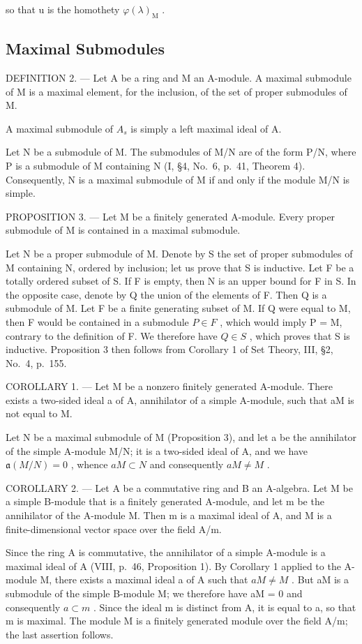 so that u is the homothety \(\varphi(\lambda)_{\mathrm{M}}\) .

\subsection{Maximal Submodules}

DEFINITION 2. --- Let A be a ring and M an A-module. A maximal submodule of M is a maximal element, for the inclusion, of the set of proper submodules of M.

A maximal submodule of \(A_{s}\) is simply a left maximal ideal of A.

Let N be a submodule of M. The submodules of M/N are of the form P/N, where P is a submodule of M containing N (I, §4, No.~6, p.~41, Theorem 4). Consequently, N is a maximal submodule of M if and only if the module M/N is simple.

PROPOSITION 3. --- Let M be a finitely generated A-module. Every proper submodule of M is contained in a maximal submodule.

Let N be a proper submodule of M. Denote by S the set of proper submodules of M containing N, ordered by inclusion; let us prove that S is inductive. Let F be a totally ordered subset of S. If F is empty, then N is an upper bound for F in S. In the opposite case, denote by Q the union of the elements of F. Then Q is a submodule of M. Let F be a finite generating subset of M. If Q were equal to M, then F would be contained in a submodule \(P \in F\) , which would imply P = M, contrary to the definition of F. We therefore have \(Q \in S\) , which proves that S is inductive. Proposition 3 then follows from Corollary 1 of Set Theory, III, §2, No.~4, p.~155.

COROLLARY 1. --- Let M be a nonzero finitely generated A-module. There exists a two-sided ideal a of A, annihilator of a simple A-module, such that aM is not equal to M.

Let N be a maximal submodule of M (Proposition 3), and let a be the annihilator of the simple A-module M/N; it is a two-sided ideal of A, and we have \(\mathfrak{a}(M/N)=0\) , whence \(aM\subset N\) and consequently \(aM\neq M\) .

COROLLARY 2. --- Let A be a commutative ring and B an A-algebra. Let M be a simple B-module that is a finitely generated A-module, and let m be the annihilator of the A-module M. Then m is a maximal ideal of A, and M is a finite-dimensional vector space over the field A/m.

Since the ring A is commutative, the annihilator of a simple A-module is a maximal ideal of A (VIII, p.~46, Proposition 1). By Corollary 1 applied to the A-module M, there exists a maximal ideal a of A such that \(aM \neq M\) . But aM is a submodule of the simple B-module M; we therefore have aM = 0 and consequently \(a \subset m\) . Since the ideal m is distinct from A, it is equal to a, so that m is maximal. The module M is a finitely generated module over the field A/m; the last assertion follows.

